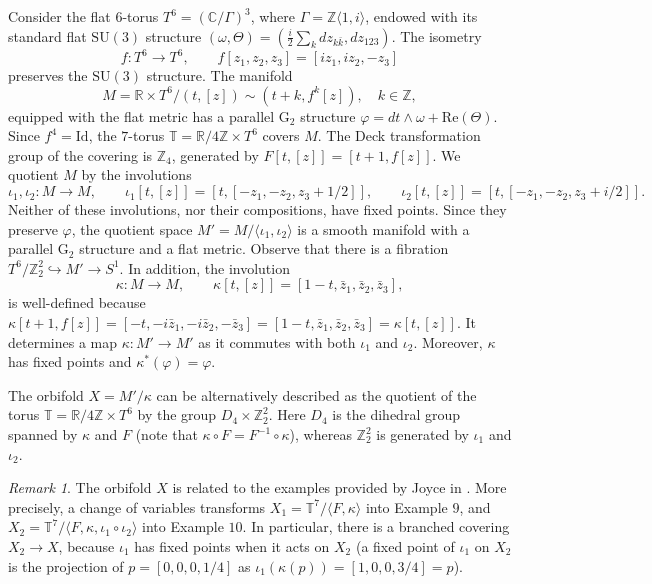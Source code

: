 \documentclass[10pt]{article}
\newcommand{\SU}[1]{\mathrm{SU}(#1)}
\newcommand{\R}{\mathbb R}
\newcommand{\Z}{\mathbb Z}
\newcommand{\Gtwo}{\mathrm{G}_2}
\newcommand{\la}{\langle}
\newcommand{\ra}{\rangle}
\newcommand{\ZZ}{\mathbb{Z}}
\newcommand{\CC}{\mathbb{C}}
\newcommand{\re}{\mathrm{Re}}
\theoremstyle{plain}
\theoremstyle{definition}
\theoremstyle{remark}
\newtheorem{remark}{Remark}
\begin{document}
Consider the flat $6$-torus $T^6 = (\CC/\Gamma)^3$, where $\Gamma=\Z \la 1, i \ra$, endowed with its standard flat $\SU{3}$ structure $(\omega,\Theta)=(\frac{i}{2}\sum_k dz_{k\bar{k}}, dz_{123})$. The isometry
\begin{equation} \label{eqn:mapping-function}
f\colon T^6 \to T^6, \qquad  f[z_1,z_2,z_3]=[iz_1,iz_2,-z_3]
\end{equation}
preserves the $\SU{3}$ structure. 
The manifold
\begin{equation} \label{eqn:M-def}
M=\R \times T^6/(t,[z])\sim (t+k,f^k[z]), \quad k\in \Z,
\end{equation}
equipped with the flat metric
has a parallel $\Gtwo$ structure 
$
\varphi=dt\wedge \omega+ \re(\Theta)
$. Since $f^4=\mathrm{Id}$, the $7$-torus  
$
\mathbb{T}= \R/4\ZZ \times T^6
$ covers $M$.
The Deck transformation group of the covering is $\Z_4$, generated by $F[t,[z]]=[t+1,f[z]]$. We quotient $M$ by the involutions 
\begin{equation}\label{eqn:iota}
\iota_1,\iota_2 \colon M \to M, \qquad \iota_1[t,[z]]=[t,[-z_1,-z_2,z_3+1/2]], \qquad 
\iota_2[t,[z]]=[t,[-z_1,-z_2,z_3+i/2]].
\end{equation}
Neither of these involutions, nor their compositions, have fixed points. Since they preserve $\varphi$, the quotient space
$M'=M/\la \iota_1,\iota_2 \ra$ is a smooth manifold with a parallel $\Gtwo$ structure and a flat metric. Observe that there is a fibration $T^6/\Z_2^2 \hookrightarrow M' \to S^1$. In addition, the involution 
\begin{equation}\label{eqn:kappa}
\kappa \colon M \to M, \qquad \kappa[t,[z]]=[1-t,\bar{z}_1,\bar{z}_2,\bar{z}_3],
\end{equation}
is well-defined because
$
\kappa[t+1,f[z]]=[-t,-i\bar{z}_1,-i\bar{z}_2,-\bar{z}_3]=[1-t,\bar{z}_1,\bar{z}_2,\bar{z}_3]=\kappa[t,[z]].
$
It determines a map $\kappa \colon M' \to M'$ as
it commutes with both $\iota_1$ and $\iota_2$. Moreover, $\kappa$ has fixed points and $\kappa^*(\varphi)=\varphi$.  %

The orbifold
$X=M'/\kappa$ can be alternatively described as the quotient of the torus $\mathbb{T}=\R/4\Z \times T^6$ by the group $D_4\times \Z_2^2$. Here $D_4$ is the dihedral group spanned by $\kappa$ and $F$ (note that $\kappa \circ F=F^{-1}\circ \kappa$), whereas $\Z_2^2$ is generated by $\iota_1$ and $\iota_2$.

\begin{remark} 
The orbifold $X$ is related to the examples provided by Joyce in \cite{J2}. More precisely, a change of variables transforms $X_1=\mathbb{T}^7/\la F, \kappa \ra$ into Example $9$, and $X_2=\mathbb{T}^7/\la F, \kappa, \iota_1 \circ \iota_2 \ra$ into Example $10$. In particular,
there is a branched covering $X_2 \to X$, because 
$\iota_1$ has fixed points when it acts on $X_2$ (a fixed point of $\iota_1$ on $X_2$ is the projection of $p=[0,0,0,1/4]$ as $\iota_1 (\kappa (p)) =[1,0,0,3/4]=p$).
\end{remark}
\end{document}
